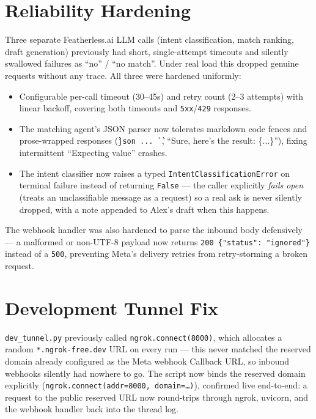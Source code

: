 \documentclass[12pt, a4paper]{report}
\begin{document}
\section{Reliability Hardening}

Three separate Featherless.ai LLM calls (intent classification, match ranking, draft generation) previously had short, single-attempt timeouts and silently swallowed failures as ``no'' / ``no match''. Under real load this dropped genuine requests without any trace. All three were hardened uniformly:

\begin{itemize}[itemsep=3pt]
    \item Configurable per-call timeout (30--45s) and retry count (2--3 attempts) with linear backoff, covering both timeouts and \texttt{5xx}/\texttt{429} responses.
    \item The matching agent's JSON parser now tolerates markdown code fences and prose-wrapped responses (\texttt{\`\`\`json ... \`\`\`}, ``Sure, here's the result: \{...\}''), fixing intermittent ``Expecting value'' crashes.
    \item The intent classifier now raises a typed \texttt{IntentClassificationError} on terminal failure instead of returning \texttt{False} --- the caller explicitly \emph{fails open} (treats an unclassifiable message as a request) so a real ask is never silently dropped, with a note appended to Alex's draft when this happens.
\end{itemize}

The webhook handler was also hardened to parse the inbound body defensively --- a malformed or non-UTF-8 payload now returns \texttt{200 \{"status": "ignored"\}} instead of a \texttt{500}, preventing Meta's delivery retries from retry-storming a broken request.

\section{Development Tunnel Fix}

\texttt{dev\_tunnel.py} previously called \texttt{ngrok.connect(8000)}, which allocates a random \texttt{*.ngrok-free.dev} URL on every run --- this never matched the reserved domain already configured as the Meta webhook Callback URL, so inbound webhooks silently had nowhere to go. The script now binds the reserved domain explicitly (\texttt{ngrok.connect(addr=8000, domain=\ldots)}), confirmed live end-to-end: a request to the public reserved URL now round-trips through ngrok, uvicorn, and the webhook handler back into the thread log.
\end{document}
